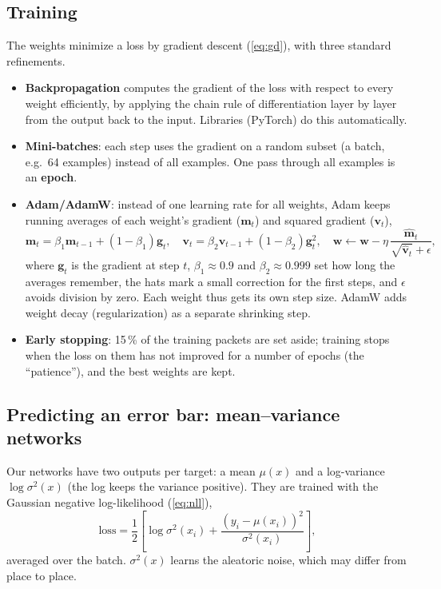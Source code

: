 \documentclass[11pt]{article}
\begin{document}
\subsection{Training}
The weights minimize a loss by gradient descent (\ref{eq:gd}), with three standard refinements.
\begin{itemize}
\item \textbf{Backpropagation} computes the gradient of the loss with respect to every weight efficiently, by applying the chain
  rule of differentiation layer by layer from the output back to the input. Libraries (PyTorch) do this automatically.
\item \textbf{Mini-batches}: each step uses the gradient on a random subset (a batch, e.g.\ 64 examples) instead of all examples.
  One pass through all examples is an \textbf{epoch}.
\item \textbf{Adam/AdamW}: instead of one learning rate for all weights, Adam keeps running averages of each weight's gradient
  ($\bm m_t$) and squared gradient ($\bm v_t$),
\begin{equation}
\bm m_t = \beta_1\bm m_{t-1} + (1-\beta_1)\bm g_t,\quad \bm v_t = \beta_2\bm v_{t-1} + (1-\beta_2)\bm g_t^2,\quad
\bm w \leftarrow \bm w - \eta\,\frac{\hat{\bm m}_t}{\sqrt{\hat{\bm v}_t} + \epsilon},
\end{equation}
  where $\bm g_t$ is the gradient at step $t$, $\beta_1 \approx 0.9$ and $\beta_2 \approx 0.999$ set how long the averages remember,
  the hats mark a small correction for the first steps, and $\epsilon$ avoids division by zero. Each weight thus gets its own step
  size. AdamW adds weight decay (regularization) as a separate shrinking step.
\item \textbf{Early stopping}: 15\,\% of the training packets are set aside; training stops when the loss on them has not improved
  for a number of epochs (the ``patience''), and the best weights are kept.
\end{itemize}

\subsection{Predicting an error bar: mean--variance networks}
Our networks have two outputs per target: a mean $\mu(x)$ and a log-variance $\log\sigma^2(x)$ (the log keeps the variance
positive). They are trained with the Gaussian negative log-likelihood (\ref{eq:nll}),
\begin{equation}
\text{loss} = \frac12\left[\log\sigma^2(x_i) + \frac{(y_i - \mu(x_i))^2}{\sigma^2(x_i)}\right],
\end{equation}
averaged over the batch. $\sigma^2(x)$ learns the aleatoric noise, which may differ from place to place.
\end{document}
